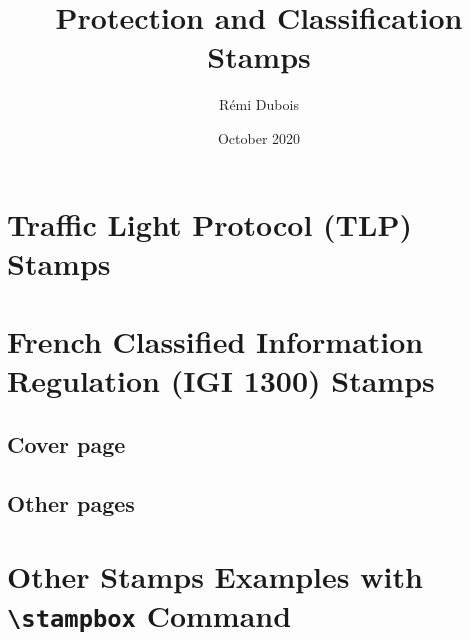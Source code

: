 \documentclass[11pt]{article}
\title{Protection and Classification Stamps}
\author{Rémi Dubois}
\date{October 2020}
\begin{document}
\section{Traffic Light Protocol (TLP) Stamps}

\begin{center}
\end{center}

\section{French Classified Information Regulation (IGI 1300) Stamps}


\subsection{Cover page}
\begin{center}
\end{center}

\subsection{Other pages}

\begin{center}
\end{center}

\section{Other Stamps Examples with \texttt{\textbackslash stampbox} Command}

\begin{center}
\end{center}
\end{document}
